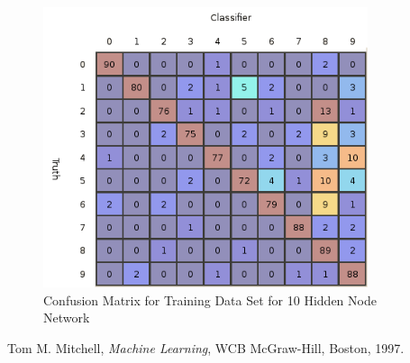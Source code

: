 \documentclass{article}
\begin{document}
\begin{figure}
\centering
\includegraphics[width=0.85\textwidth]{data/final/10_train_confusion.png}
\caption{Confusion Matrix for Training Data Set for 10 Hidden Node Network}
\label{trainconfusion10}
\end{figure}

\begin{thebibliography}{9}

  Tom M. Mitchell,
  \emph{Machine Learning},
  WCB McGraw-Hill, Boston,
  1997.

\end{thebibliography}
\end{document}

